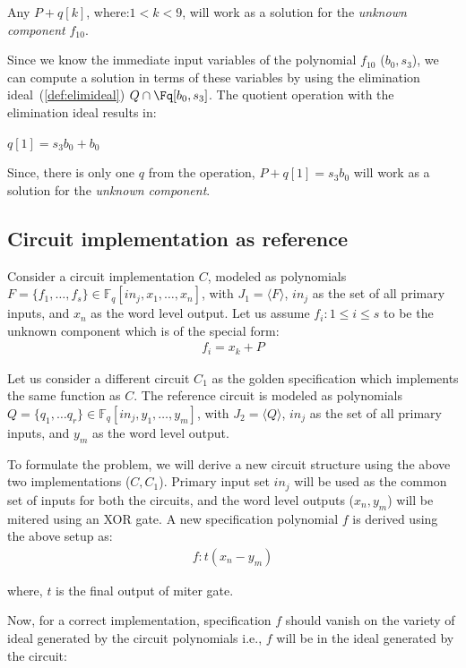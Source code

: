 \begin{Example}
Any $P+q[k]$, where:$1<k<9$, will work as a solution for the \textit{unknown component} $f_{10}$.

Since we know the immediate input variables of the polynomial $f_{10}$ ($b_0,s_3$), we can compute a solution in terms of these variables by using the elimination ideal~(\autoref{def:elimideal}) $Q \cap \Fq[b_0,s_3]$. The quotient operation with the elimination ideal results in:\\
\begin{small}
$q[1]=s_3b_0 + b_0$
\end{small}

Since, there is only one $q$ from the operation, $P+q[1]=s_3b_0$ will work as a solution for the \textit{unknown component}.

\end{Example}

\subsection{Circuit implementation as reference}
Consider a circuit implementation $C$, modeled as polynomials $F = \{f_1,\dots,f_s\}\in \mathbb{F}_q[in_j,x_1,\dots, x_n]$, with $J_1=\langle F \rangle$, $in_j$ as the set of all primary inputs, and $x_n$ as the word level output. Let us assume $f_i:1\le i \le s$ to be the unknown component which is of the special form:
\begin{gather*} 
f_i = x_k + P
\end{gather*}

Let us consider a different circuit $C_1$ as the golden specification which implements the same function as $C$. The reference circuit is modeled as polynomials $Q = \{q_1,\dots q_r\}\in \mathbb{F}_q[in_j,y_1,\dots, y_m]$, with $J_2=\langle Q \rangle$, $in_j$ as the set of all primary inputs, and $y_m$ as the word level output.

To formulate the problem, we will derive a new circuit structure using the above two implementations ($C,C_1$). Primary input set $in_j$ will be used as the common set of inputs for both the circuits, and the word level outputs ($x_n,y_m$) will be mitered using an XOR gate. A new specification polynomial $f$ is derived using the above setup as:
\begin{gather}
f : t(x_n-y_m)
\end{gather}

where, $t$ is the final output of miter gate.

Now, for a correct implementation, specification $f$ should vanish on the variety of ideal generated by the circuit polynomials i.e., $f$ will be in the ideal generated by the circuit:

